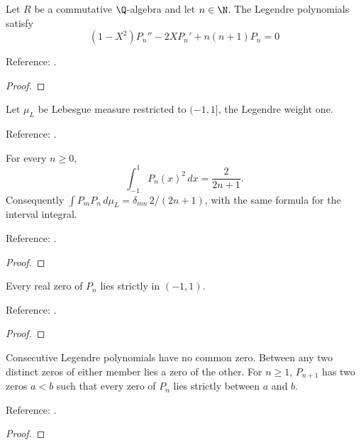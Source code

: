 \begin{theorem}
\label{thm:legendre-ode}
\leanok
Let $R$ be a commutative $\Q$-algebra and let $n\in\N$. The Legendre polynomials satisfy
\[(1-X^2)P_n''-2XP_n'+n(n+1)P_n=0\]


Reference: \cite[Table 18.8.1]{dlmf}.
\end{theorem}
\begin{proof}
\leanok
\end{proof}

\begin{definition}
\label{def:legendre-measure}
\leanok
Let $\mu_L$ be Lebesgue measure restricted to $(-1,1]$, the Legendre weight one.

Reference: \cite[Table 18.3.1]{dlmf}.
\end{definition}

\begin{theorem}
\label{thm:legendre-norm}
\leanok
For every $n\ge0$,
\[\int_{-1}^{1}P_n(x)^2\,dx=\frac{2}{2n+1}.\]
Consequently $\int P_mP_n\,d\mu_L=\delta_{mn}\,2/(2n+1)$, with the same
formula for the interval integral.

Reference: \cite[Table 18.3.1]{dlmf}.
\end{theorem}
\begin{proof}
\leanok
\end{proof}

\begin{theorem}
\label{thm:legendre-root-location}
\leanok
Every real zero of $P_n$ lies strictly in $(-1,1)$.

Reference: \cite[18.2(vi)]{dlmf}.
\end{theorem}
\begin{proof}
\leanok
\end{proof}

\begin{theorem}
\label{thm:legendre-interlacing}
\leanok
Consecutive Legendre polynomials have no common zero. Between any two distinct zeros of either member lies a zero of the other. For $n\ge1$, $P_{n+1}$ has two zeros $a<b$ such that every zero of $P_n$ lies strictly between $a$ and $b$.

Reference: \cite[18.2(vi)]{dlmf}.
\end{theorem}
\begin{proof}
\leanok
\end{proof}

